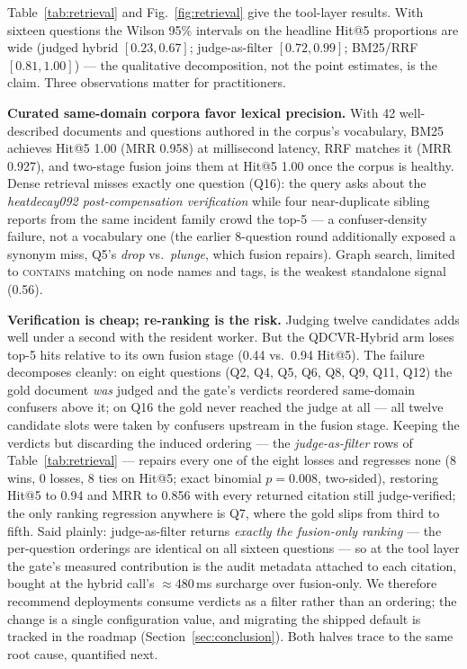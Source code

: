 \documentclass[preprint,12pt]{elsarticle}
\begin{document}
Table~\ref{tab:retrieval} and Fig.~\ref{fig:retrieval} give the tool-layer
results. With sixteen questions the Wilson 95\% intervals on the headline
Hit@5 proportions are wide (judged hybrid $[0.23, 0.67]$; judge-as-filter
$[0.72, 0.99]$; BM25/RRF $[0.81, 1.00]$) --- the qualitative decomposition,
not the point estimates, is the claim. Three observations matter for
practitioners.

\textbf{Curated same-domain corpora favor lexical precision.} With 42
well-described documents and questions authored in the corpus's vocabulary,
BM25 achieves Hit@5 1.00 (MRR 0.958) at millisecond latency, RRF matches it
(MRR 0.927), and two-stage fusion joins them at Hit@5 1.00 once the
corpus is healthy. Dense retrieval misses exactly one question (Q16): the
query asks about the \emph{heatdecay092 post-compensation verification}
while four near-duplicate sibling reports from the same incident family
crowd the top-5 --- a confuser-density failure, not a vocabulary one (the
earlier 8-question round additionally exposed a synonym miss, Q5's
\emph{drop} vs.\ \emph{plunge}, which fusion repairs). Graph search,
limited to \textsc{contains} matching on node names and tags, is the
weakest standalone signal (0.56).

\textbf{Verification is cheap; re-ranking is the risk.} Judging twelve
candidates adds well under a second with the resident worker. But the
QDCVR-Hybrid arm loses top-5 hits relative to its own fusion stage
(0.44 vs.\ 0.94 Hit@5). The failure decomposes cleanly: on eight questions
(Q2, Q4, Q5, Q6, Q8, Q9, Q11, Q12) the gold document \emph{was} judged and
the gate's verdicts reordered same-domain confusers above it; on Q16 the
gold never reached the judge at all --- all twelve candidate slots were
taken by confusers upstream in the fusion stage. Keeping the verdicts but
discarding the induced ordering --- the \emph{judge-as-filter} rows of
Table~\ref{tab:retrieval} --- repairs every one of the eight losses and
regresses none (8 wins, 0 losses, 8 ties on Hit@5; exact binomial
$p = 0.008$, two-sided), restoring Hit@5 to 0.94 and MRR to 0.856 with
every returned citation still judge-verified; the only ranking regression
anywhere is Q7, where the gold slips from third to fifth. Said plainly:
judge-as-filter returns \emph{exactly the fusion-only ranking} --- the
per-question orderings are identical on all sixteen questions --- so at
the tool layer the gate's measured contribution is the audit metadata
attached to each citation, bought at the hybrid call's $\approx$480\,ms
surcharge over fusion-only. We therefore recommend deployments consume
verdicts as a filter rather than an ordering; the change is a single
configuration value, and migrating the shipped default is tracked in the
roadmap (Section~\ref{sec:conclusion}). Both halves
trace to the same root cause, quantified next.
\end{document}

